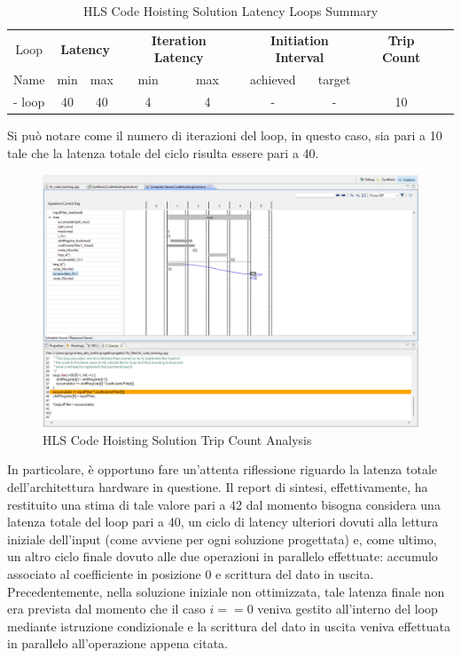 \begin{table}[H]
    \centering
    \begin{tabular}{|c|c|c|c|c|c|c|c|c|}
        \hline
        \multicolumn{1}{|c|}{Loop} & \multicolumn{2}{|c|}{\textbf{Latency}} & \multicolumn{2}{c|}{\textbf{Iteration Latency}} & \multicolumn{2}{c|}{\textbf{Initiation Interval}} & \multicolumn{1}{c|}{\textbf{Trip Count}}  \\
        Name & min & max & min & max & achieved & target &  \\
        \hline
        - loop & 40 & 40 & 4 & 4 & - & - & 10 \\
        \hline
    \end{tabular}
    \caption{HLS Code Hoisting Solution Latency Loops Summary }
    \label{tab:hls-code-hoisting-solution-loop-summary}
\end{table}

Si può notare come il numero di iterazioni del loop, in questo caso, sia pari a 10 tale che la latenza totale del ciclo risulta essere pari a 40.

\begin{figure}[H]
    \centering
    \includegraphics[width=1\textwidth]{solutions/code_hoisting/codehoistinganalysis.png}
    \caption{HLS Code Hoisting Solution Trip Count Analysis}
\end{figure}

In particolare, è opportuno fare un'attenta riflessione riguardo la latenza totale dell'architettura hardware in questione. Il report di sintesi, effettivamente, ha restituito una stima di tale valore pari a 42 dal momento bisogna considera una latenza totale del loop pari a 40, un ciclo di latency ulteriori dovuti alla lettura iniziale dell'input (come avviene per ogni soluzione progettata) e, come ultimo, un altro ciclo finale dovuto alle due operazioni in parallelo effettuate: accumulo associato al coefficiente in posizione 0 e scrittura del dato in uscita. Precedentemente, nella soluzione iniziale non ottimizzata, tale latenza finale non era prevista dal momento che il caso $i==0$ veniva gestito all'interno del loop mediante istruzione condizionale e la scrittura del dato in uscita veniva effettuata in parallelo all'operazione appena citata.

